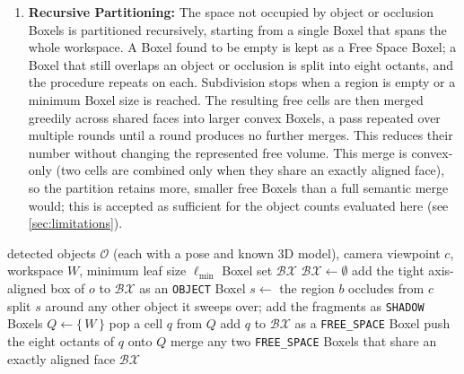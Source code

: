 \begin{enumerate}
    \item \textbf{Recursive Partitioning:} The space not occupied by object or occlusion Boxels is partitioned recursively, starting from a single Boxel that spans the whole workspace. A Boxel found to be empty is kept as a Free Space Boxel; a Boxel that still overlaps an object or occlusion is split into eight octants, and the procedure repeats on each. Subdivision stops when a region is empty or a minimum Boxel size is reached. The resulting free cells are then merged greedily across shared faces into larger convex Boxels, a pass repeated over multiple rounds until a round produces no further merges. This reduces their number without changing the represented free volume. This merge is convex-only (two cells are combined only when they share an exactly aligned face), so the partition retains more, smaller free Boxels than a full semantic merge would; this is accepted as sufficient for the object counts evaluated here (see \cref{sec:limitations}).
\end{enumerate}

\begin{algorithm}[H]
\caption{Adaptive Semantic Discretization}
\label{alg:discretization}
\begin{algorithmic}[1]
\Require detected objects $\mathcal{O}$ (each with a pose and known 3D model), camera viewpoint $c$, workspace $W$, minimum leaf size $\ell_{\min}$
\Ensure Boxel set $\mathcal{BX}$
  \State $\mathcal{BX} \gets \emptyset$
    \State add the tight axis-aligned box of $o$ to $\mathcal{BX}$ as an \texttt{OBJECT} Boxel
  \EndFor
    \State $s \gets$ the region $b$ occludes from $c$
    \State split $s$ around any other object it sweeps over; add the fragments as \texttt{SHADOW} Boxels
  \EndFor
  \State $Q \gets \{\, W \,\}$
    \State pop a cell $q$ from $Q$
      \State add $q$ to $\mathcal{BX}$ as a \texttt{FREE\_SPACE} Boxel 
      \State push the eight octants of $q$ onto $Q$ 
    \EndIf
  \EndWhile
  \Repeat{}
    \State merge any two \texttt{FREE\_SPACE} Boxels that share an exactly aligned face
  \State \Return $\mathcal{BX}$
\end{algorithmic}
\end{algorithm}

